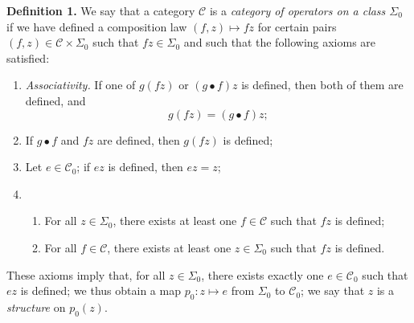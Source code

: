 \documentclass{article}
\newenvironment{rmenv}[1]
  {\phantomsection\par\medskip\noindent\textbf{#1.}\rmfamily}
  {\par\medskip}
\newcommand{\CC}{\mathcal{C}}
\newcommand{\dotc}{{\mathbin{\bullet}}}
\begin{document}
\begin{rmenv}{Definition 1}
  We say that a category $\CC$ is a \emph{category of operators on a class $\Sigma_0$} if we have defined a composition law $(f,z)\mapsto fz$ for certain pairs $(f,z)\in\CC\times\Sigma_0$ such that $fz\in\Sigma_0$ and such that the following axioms are satisfied:
  \begin{enumerate}
    \item \emph{Associativity.}
      If one of $g(fz)$ or $(g\dotc f)z$ is defined, then both of them are defined, and
      \[
        g(fz)
        = (g\dotc f)z;
      \]
    \item If $g\dotc f$ and $fz$ are defined, then $g(fz)$ is defined;
    \item Let $e\in\CC_0$;
      if $ez$ is defined, then $ez=z$;
    \item
      \begin{enumerate}
        \item For all $z\in\Sigma_0$, there exists at least one $f\in\CC$ such that $fz$ is defined;
        \item For all $f\in\CC$, there exists at least one $z\in\Sigma_0$ such that $fz$ is defined.
      \end{enumerate}
  \end{enumerate}
\end{rmenv}

These axioms imply that, for all $z\in\Sigma_0$, there exists exactly one $e\in\CC_0$ such that $ez$ is defined;
we thus obtain a map $p_0\colon z\mapsto e$ from $\Sigma_0$ to $\CC_0$;
we say that $z$ is a \emph{structure} on $p_0(z)$.





\nocite{*}
\printbibliography[heading=bibintoc,title=Bibliography]
\end{document}

